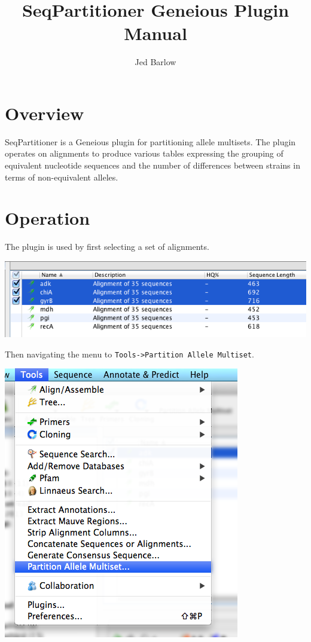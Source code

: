 \documentclass[12pt,letterpaper]{article}
\author{Jed Barlow}
\title{SeqPartitioner Geneious Plugin Manual}
\begin{document}
\maketitle

\hfill

\tableofcontents

\newpage
\section{Overview}

SeqPartitioner is a Geneious plugin for partitioning allele multisets.  The
plugin operates on alignments to produce various tables expressing the grouping
of equivalent nucleotide sequences and the number of differences between
strains in terms of non-equivalent alleles.

\section{Operation}
The plugin is used by first selecting a set of alignments.

\hfill

\includegraphics[resolution=120]{alignment_selection.png}

\hfill

Then navigating the menu to \texttt{Tools->Partition Allele Multiset}.


\hfill

\includegraphics[resolution=130]{menu_entry.png}
\end{document}
